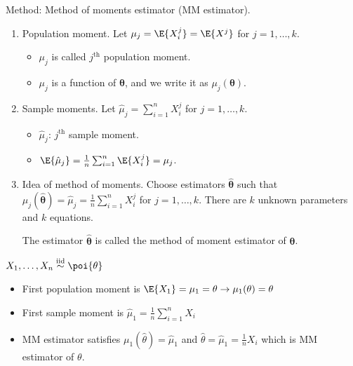 Method: Method of moments estimator (MM estimator).
\begin{enumerate}
      \item Population moment. Let $ \mu_j=\E{X_i^j}=\E{X^j} $
            for $ j=1,\ldots,k $.
            \begin{itemize}
                  \item $ \mu_j $ is called $ j^{\text{th}} $ population moment.
                  \item $ \mu_j $ is a function of $ \symbf{\theta} $,
                        and we write it as $ \mu_j(\symbf{\theta}) $.
            \end{itemize}
      \item Sample moments. Let $ \hat{\mu}_j=\sum_{i=1}^{n} X_i^j $ for
            $ j=1,\ldots,k $.
            \begin{itemize}
                  \item $ \hat{\mu}_j $: $ j^{\text{th}} $ sample moment.
                  \item $ \E{\hat{\mu}_j}=\frac{1}{n} \sum_{i=1}^{n}\E{X_i^j}=\mu_j $.
            \end{itemize}
      \item Idea of method of moments.
            Choose estimators $ \hat{\symbf{\theta}} $
            such that $ \mu_j(\hat{\symbf{\theta}})=
                  \hat{\mu}_j=\frac{1}{n} \sum_{i=1}^{n} X_i^j $
            for
            $ j=1,\ldots,k $. There are $ k $ unknown parameters
            and $ k $ equations.

            The estimator $ \hat{\symbf{\theta}} $ is called the method
            of moment estimator of $ \symbf{\theta} $.
\end{enumerate}

\begin{Example}{}{}
      $ X_1,\ldots,X_n\stackrel{\text{iid}}{\sim}\poi{\theta} $
      \begin{itemize}
            \item First population moment is $ \E{X_1}=\mu_1=\theta\to
                        \mu_1(\theta)=\theta $
            \item First sample moment is $ \hat{\mu}_1=\frac{1}{n} \sum_{i=1}^{n} X_i $
            \item MM estimator satisfies $ \mu_1(\hat{\theta})=\hat{\mu}_1 $
                  and $ \hat{\theta}=\hat{\mu}_1=\frac{1}{n}X_i $
                  which is MM estimator of $ \theta $.
      \end{itemize}
\end{Example}
